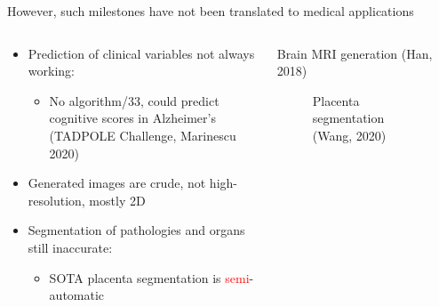 \documentclass[8pt,xcolor=table]{beamer}
\begin{document}
\begin{frame}{However, such milestones have not been translated to medical applications}

\begin{columns}[t]
\begin{column}{0.5\textwidth}
\centering

\begin{itemize}
\item Prediction of clinical variables not always working: 
\begin{itemize}
\item No algorithm/33, could predict cognitive scores in Alzheimer's\\ (TADPOLE Challenge, Marinescu 2020)
\end{itemize}
\vspace{4em}

\item Generated images are crude, not high-resolution, mostly 2D

\vspace{4em}

\item Segmentation of pathologies and organs still inaccurate:
\begin{itemize}
\item SOTA placenta segmentation is \textcolor{red}{semi}-automatic
\end{itemize}


\end{itemize}


\end{column}
\begin{column}{0.5\textwidth}
\centering
Brain MRI generation (Han, 2018)
\begin{figure}

\vo


Placenta segmentation (Wang, 2020)


\end{figure}
\end{column}
\end{columns}

 
 
\end{frame}
\end{document}
